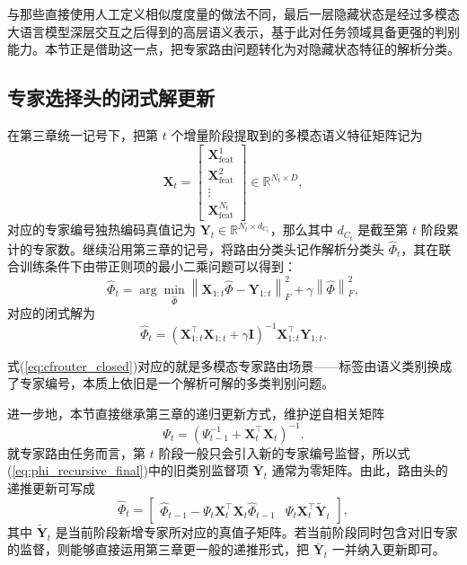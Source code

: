 与那些直接使用人工定义相似度度量的做法不同，最后一层隐藏状态是经过多模态大语言模型深层交互之后得到的高层语义表示，基于此对任务领域具备更强的判别能力。本节正是借助这一点，把专家路由问题转化为对隐藏状态特征的解析分类。

\subsection{专家选择头的闭式解更新}

在第三章统一记号下，把第 $t$ 个增量阶段提取到的多模态语义特征矩阵记为
\begin{equation}
\mathbf{X}_t=\begin{bmatrix}
\mathbf{X}_{\mathrm{feat}}^{1} \\
\mathbf{X}_{\mathrm{feat}}^{2} \\
\vdots \\
\mathbf{X}_{\mathrm{feat}}^{N_t}
\end{bmatrix}
\in \mathbb{R}^{N_t \times D},
\end{equation}
对应的专家编号独热编码真值记为 $\mathbf{Y}_t \in \mathbb{R}^{N_t \times d_{C_t}}$，那么其中 $d_{C_t}$ 是截至第 $t$ 阶段累计的专家数。继续沿用第三章的记号，将路由分类头记作解析分类头 $\widehat{\Phi}_t$，其在联合训练条件下由带正则项的最小二乘问题可以得到：
\begin{equation}
\widehat{\Phi}_t=
\arg\min_{\widehat{\Phi}}
\left\|\mathbf{X}_{1:t}\widehat{\Phi}-\mathbf{Y}_{1:t}\right\|_F^2
+\gamma\left\|\widehat{\Phi}\right\|_F^2,
\end{equation}
对应的闭式解为
\begin{equation}
\widehat{\Phi}_t=
\left(\mathbf{X}_{1:t}^{\top}\mathbf{X}_{1:t}+\gamma \mathbf{I}\right)^{-1}
\mathbf{X}_{1:t}^{\top}\mathbf{Y}_{1:t}.
\label{eq:cfrouter_closed}
\end{equation}

式(\ref{eq:cfrouter_closed})对应的就是多模态专家路由场景——标签由语义类别换成了专家编号，本质上依旧是一个解析可解的多类判别问题。

进一步地，本节直接继承第三章的递归更新方式，维护逆自相关矩阵
\begin{equation}
\Psi_t=\left(\Psi_{t-1}^{-1}+\mathbf{X}_t^{\top}\mathbf{X}_t\right)^{-1}.
\label{eq:cfrouter_psi}
\end{equation}
就专家路由任务而言，第 $t$ 阶段一般只会引入新的专家编号监督，所以式(\ref{eq:phi_recursive_final})中的旧类别监督项 $\bar{\mathbf{Y}}_t$ 通常为零矩阵。由此，路由头的递推更新可写成
\begin{equation}
\widehat{\Phi}_t=
\begin{bmatrix}
\widehat{\Phi}_{t-1}-\Psi_t\mathbf{X}_t^{\top}\mathbf{X}_t\widehat{\Phi}_{t-1}
&
\Psi_t\mathbf{X}_t^{\top}\tilde{\mathbf{Y}}_t
\end{bmatrix},
\label{eq:cfrouter_update}
\end{equation}
其中 $\tilde{\mathbf{Y}}_t$ 是当前阶段新增专家所对应的真值子矩阵。若当前阶段同时包含对旧专家的监督，则能够直接运用第三章更一般的递推形式，把 $\bar{\mathbf{Y}}_t$ 一并纳入更新即可。

